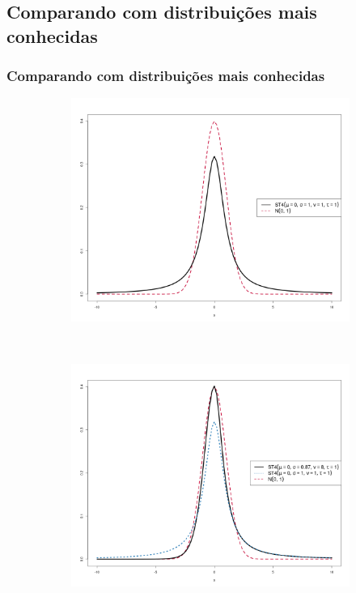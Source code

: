 \documentclass[13pt, aspectratio=169]{beamer}
\begin{document}
\subsection{Comparando com distribuições mais conhecidas}

\begin{frame}
    \frametitle{Comparando com distribuições mais conhecidas}

   \begin{figure}[!ht]
        \centering
        \begin{subfigure}[t]{0.43\textwidth}
            \centering
            \includegraphics[width=\textwidth]{images/comparando_dists_1.png}
            \caption{}
        \end{subfigure}%
        ~
        \pause
        \begin{subfigure}[t]{0.43\textwidth}
            \centering
            \includegraphics[width=\textwidth]{images/comparando_dists_2.png}
            \caption{}
        \end{subfigure}%
        \caption{}
    \end{figure} 

\end{frame}
\end{document}
